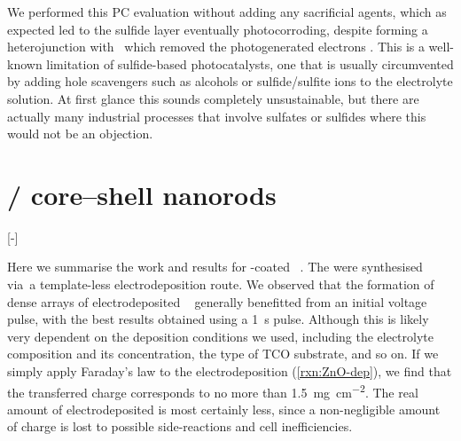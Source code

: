 \documentclass[webedition,openright,titles,swedish,english]{LuaUUThesis}\usepackage[]{graphicx}\usepackage[]{xcolor}
\newcommand{\via}{via}
\begin{document}
We performed this \gls{PC} evaluation without adding any sacrificial agents,
which as expected led to the sulfide layer eventually photocorroding, despite
forming a heterojunction with \ZnO\ which removed the photogenerated electrons \cite{Jafari2016}.
This is a well-known limitation of sulfide-based photocatalysts, one that is
usually circumvented by adding hole scavengers such as alcohols or sulfide/sulfite ions
to the electrolyte solution. At first glance this sounds completely unsustainable, but
there are actually many industrial processes that involve sulfates or sulfides
where this would not be an objection.




\clearpage
%


%















%

\section{\texorpdfstring{/ core--shell nanorods}{ZnO/Fe₂O₃ core–shell nanorods}}
\label{results:P03-ZnO-Fe2O3-nanorods}
[-\baselineskip]

Here we summarise the work and results for \ironox-coated \ZnO\ .
The  were synthesised \via\ a template-less electrodeposition route.
We observed that the formation of dense arrays of electrodeposited \zincox\ 
generally benefitted from an initial voltage pulse, with the best results obtained
using a \qty{1}{\second} pulse.
Although this is likely very dependent on the deposition conditions we used,
including the electrolyte composition and its concentration, the type of
\gls{TCO} substrate, and so on.
If we simply apply Faraday's law to the  electrodeposition
(\cref{rxn:ZnO-dep}), we find that the
transferred charge corresponds to no more than \qty{1.5}{\mg\per\square\cm}.
The real amount of electrodeposited  is most certainly less, since
a non-negligible amount of charge is lost to possible side-reactions and
cell inefficiencies.
\end{document}
